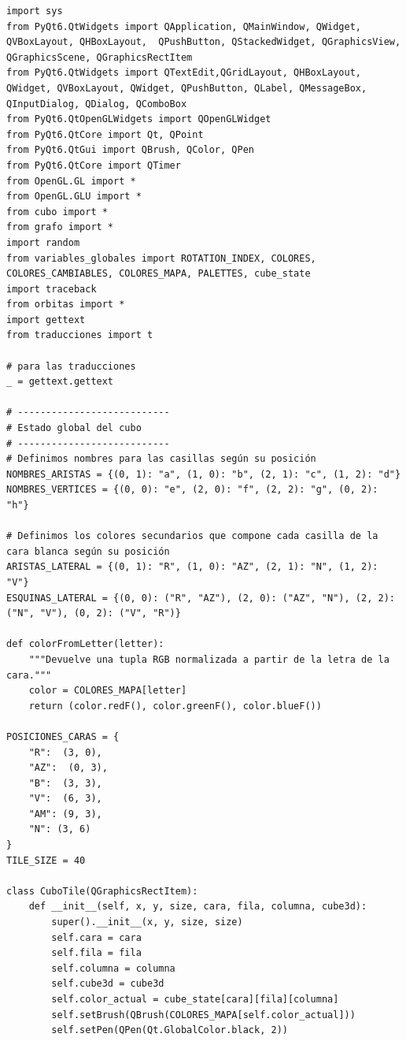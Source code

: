 \begin{lstlisting}
import sys
from PyQt6.QtWidgets import QApplication, QMainWindow, QWidget, QVBoxLayout, QHBoxLayout,  QPushButton, QStackedWidget, QGraphicsView, QGraphicsScene, QGraphicsRectItem
from PyQt6.QtWidgets import QTextEdit,QGridLayout, QHBoxLayout, QWidget, QVBoxLayout, QWidget, QPushButton, QLabel, QMessageBox, QInputDialog, QDialog, QComboBox
from PyQt6.QtOpenGLWidgets import QOpenGLWidget
from PyQt6.QtCore import Qt, QPoint
from PyQt6.QtGui import QBrush, QColor, QPen
from PyQt6.QtCore import QTimer
from OpenGL.GL import *
from OpenGL.GLU import *
from cubo import *
from grafo import *
import random
from variables_globales import ROTATION_INDEX, COLORES, COLORES_CAMBIABLES, COLORES_MAPA, PALETTES, cube_state
import traceback
from orbitas import *
import gettext
from traducciones import t

# para las traducciones
_ = gettext.gettext

# ---------------------------
# Estado global del cubo
# ---------------------------
# Definimos nombres para las casillas según su posición
NOMBRES_ARISTAS = {(0, 1): "a", (1, 0): "b", (2, 1): "c", (1, 2): "d"}
NOMBRES_VERTICES = {(0, 0): "e", (2, 0): "f", (2, 2): "g", (0, 2): "h"}

# Definimos los colores secundarios que compone cada casilla de la cara blanca según su posición
ARISTAS_LATERAL = {(0, 1): "R", (1, 0): "AZ", (2, 1): "N", (1, 2): "V"}
ESQUINAS_LATERAL = {(0, 0): ("R", "AZ"), (2, 0): ("AZ", "N"), (2, 2): ("N", "V"), (0, 2): ("V", "R")}

def colorFromLetter(letter):
    """Devuelve una tupla RGB normalizada a partir de la letra de la cara."""
    color = COLORES_MAPA[letter]
    return (color.redF(), color.greenF(), color.blueF())

POSICIONES_CARAS = {
    "R":  (3, 0),
    "AZ":  (0, 3),
    "B":  (3, 3),
    "V":  (6, 3),
    "AM": (9, 3),
    "N": (3, 6)
}
TILE_SIZE = 40

class CuboTile(QGraphicsRectItem):
    def __init__(self, x, y, size, cara, fila, columna, cube3d):
        super().__init__(x, y, size, size)
        self.cara = cara
        self.fila = fila
        self.columna = columna
        self.cube3d = cube3d
        self.color_actual = cube_state[cara][fila][columna]
        self.setBrush(QBrush(COLORES_MAPA[self.color_actual]))
        self.setPen(QPen(Qt.GlobalColor.black, 2))
       

\end{lstlisting}
